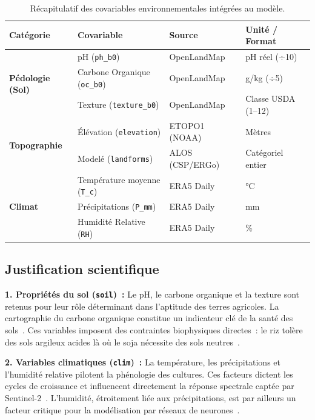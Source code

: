 \begin{table}[H]
\centering
\small
\begin{tabular}{|l|l|l|l|}
\hline
\textbf{Catégorie} & \textbf{Covariable} & \textbf{Source} & \textbf{Unité / Format} \\ \hline
\multirow{3}{*}{\textbf{Pédologie (Sol)}}
  & pH (\texttt{ph\_b0})               & OpenLandMap & pH réel (÷10) \\ \cline{2-4}
  & Carbone Organique (\texttt{oc\_b0}) & OpenLandMap & g/kg (÷5)     \\ \cline{2-4}
  & Texture (\texttt{texture\_b0})      & OpenLandMap & Classe USDA (1--12) \\ \hline
\multirow{2}{*}{\textbf{Topographie}}
  & Élévation (\texttt{elevation})      & ETOPO1 (NOAA) & Mètres \\ \cline{2-4}
  & Modelé (\texttt{landforms})         & ALOS (CSP/ERGo) & Catégoriel entier \\ \hline
\multirow{3}{*}{\textbf{Climat}}
  & Température moyenne (\texttt{T\_c}) & ERA5 Daily & °C \\ \cline{2-4}
  & Précipitations (\texttt{P\_mm})     & ERA5 Daily & mm \\ \cline{2-4}
  & Humidité Relative (\texttt{RH})     & ERA5 Daily & \% \\ \hline
\end{tabular}
\caption{Récapitulatif des covariables environnementales intégrées au modèle.}
\label{tab:covariables}
\end{table}

\subsection{Justification scientifique}

\textbf{1. Propriétés du sol (\texttt{soil})~:} Le pH, le carbone organique et la
texture sont retenus pour leur rôle déterminant dans l'aptitude des terres agricoles.
La cartographie du carbone organique constitue un indicateur clé de la santé des
sols~\cite{ou2024}. Ces variables imposent des contraintes biophysiques directes~:
le riz tolère des sols argileux acides là où le soja nécessite des sols neutres~\cite{tufail2025}.

\textbf{2. Variables climatiques (\texttt{clim})~:} La température, les précipitations
et l'humidité relative pilotent la phénologie des cultures. Ces facteurs dictent les
cycles de croissance et influencent directement la réponse spectrale captée par
Sentinel-2~\cite{wang2024}. L'humidité, étroitement liée aux précipitations, est
par ailleurs un facteur critique pour la modélisation par réseaux de neurones~\cite{jiao2025}.

